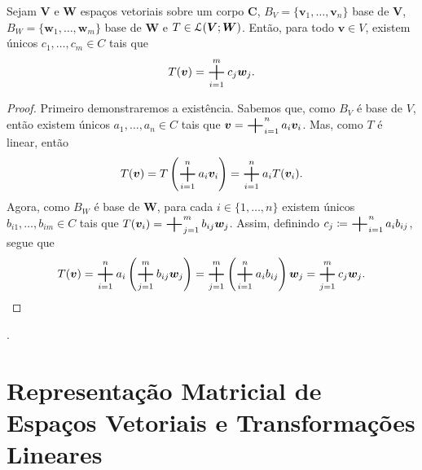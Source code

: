 \begin{prop}
	Sejam $\bm V$ e $\bm W$ espaços vetoriais sobre um corpo $\bm C$, $B_V=\{\bm v_1,\ldots,\bm v_n\}$ base de $\bm V$, $B_W=\{\bm w_1,\ldots,\bm w_m\}$ base de $\bm W$ e $T \in \mathcal{L}(\bm V;\bm W)$. Então, para todo $\bm v \in V$, existem únicos $c_1,\ldots,c_m \in C$ tais que
	\begin{equation*}
	T(\bm v) = \bigsum_{i=1}^m c_j \bm w_j.
	\end{equation*}
\end{prop}
\begin{proof}
	Primeiro demonstraremos a existência. Sabemos que, como $B_V$ é base de $V$, então existem únicos $a_1,\ldots,a_n \in C$ tais que $\bm v = \bigsum_{i=1}^n a_i\bm v_i$. Mas, como $T$ é linear, então
	\begin{equation*}
	T(\bm v) = T\left( \bigsum_{i=1}^n a_i \bm v_i \right) = \bigsum_{i=1}^n a_i T(\bm v_i).
	\end{equation*}
	Agora, como $B_W$ é base de $\bm W$, para cada $i \in \{1,\ldots,n\}$ existem únicos $b_{i1},\ldots,b_{im} \in C$ tais que  $T(\bm v_i)=\bigsum_{j=1}^m b_{ij} \bm w_j$. Assim, definindo $c_j \coloneqq \bigsum_{i=1}^n a_i b_{ij}$, segue que
	\begin{equation*}
	T(\bm v)=\bigsum_{i=1}^n a_i \left(\bigsum_{j=1}^m b_{ij} \bm w_j \right) = \bigsum_{j=1}^m \left(\bigsum_{i=1}^n a_i b_{ij}\right) \bm w_j = \bigsum_{j=1}^m c_j \bm w_j.
	\end{equation*}

\end{proof}







































\newpage
.
\newpage

\section[Representação Matricial]{Representação Matricial de Espaços Vetoriais e Transformações Lineares}


